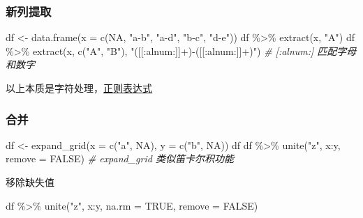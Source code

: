 \documentclass[
]{book}
\newenvironment{Shaded}{\begin{snugshade}}{\end{snugshade}}
\newcommand{\AttributeTok}[1]{\textcolor[rgb]{0.77,0.63,0.00}{#1}}
\newcommand{\CommentTok}[1]{\textcolor[rgb]{0.56,0.35,0.01}{\textit{#1}}}
\newcommand{\ConstantTok}[1]{\textcolor[rgb]{0.00,0.00,0.00}{#1}}
\newcommand{\FunctionTok}[1]{\textcolor[rgb]{0.00,0.00,0.00}{#1}}
\newcommand{\NormalTok}[1]{#1}
\newcommand{\OtherTok}[1]{\textcolor[rgb]{0.56,0.35,0.01}{#1}}
\newcommand{\SpecialCharTok}[1]{\textcolor[rgb]{0.00,0.00,0.00}{#1}}
\newcommand{\StringTok}[1]{\textcolor[rgb]{0.31,0.60,0.02}{#1}}
\begin{document}
\hypertarget{ux65b0ux5217ux63d0ux53d6}{%
\subsubsection{新列提取}\label{ux65b0ux5217ux63d0ux53d6}}

\begin{Shaded}
\begin{Highlighting}[]
\NormalTok{df }\OtherTok{\textless{}{-}} \FunctionTok{data.frame}\NormalTok{(}\AttributeTok{x =} \FunctionTok{c}\NormalTok{(}\ConstantTok{NA}\NormalTok{, }\StringTok{"a{-}b"}\NormalTok{, }\StringTok{"a{-}d"}\NormalTok{, }\StringTok{"b{-}c"}\NormalTok{, }\StringTok{"d{-}e"}\NormalTok{))}
\NormalTok{df }\SpecialCharTok{\%\textgreater{}\%} \FunctionTok{extract}\NormalTok{(x, }\StringTok{"A"}\NormalTok{)}
\NormalTok{df }\SpecialCharTok{\%\textgreater{}\%} \FunctionTok{extract}\NormalTok{(x, }\FunctionTok{c}\NormalTok{(}\StringTok{"A"}\NormalTok{, }\StringTok{"B"}\NormalTok{), }\StringTok{"([[:alnum:]]+){-}([[:alnum:]]+)"}\NormalTok{)}
\CommentTok{\# [:alnum:] 匹配字母和数字}
\end{Highlighting}
\end{Shaded}

以上本质是字符处理，\href{http://baiy.cn/utils/_regex_doc/index.htm}{正则表达式}

\hypertarget{ux5408ux5e76}{%
\subsubsection{合并}\label{ux5408ux5e76}}

\begin{Shaded}
\begin{Highlighting}[]
\NormalTok{df }\OtherTok{\textless{}{-}} \FunctionTok{expand\_grid}\NormalTok{(}\AttributeTok{x =} \FunctionTok{c}\NormalTok{(}\StringTok{"a"}\NormalTok{, }\ConstantTok{NA}\NormalTok{), }\AttributeTok{y =} \FunctionTok{c}\NormalTok{(}\StringTok{"b"}\NormalTok{, }\ConstantTok{NA}\NormalTok{))}
\NormalTok{df}
\NormalTok{df }\SpecialCharTok{\%\textgreater{}\%} \FunctionTok{unite}\NormalTok{(}\StringTok{"z"}\NormalTok{, x}\SpecialCharTok{:}\NormalTok{y, }\AttributeTok{remove =} \ConstantTok{FALSE}\NormalTok{)}
\CommentTok{\# expand\_grid 类似笛卡尔积功能}
\end{Highlighting}
\end{Shaded}

移除缺失值

\begin{Shaded}
\begin{Highlighting}[]
\NormalTok{df }\SpecialCharTok{\%\textgreater{}\%} \FunctionTok{unite}\NormalTok{(}\StringTok{"z"}\NormalTok{, x}\SpecialCharTok{:}\NormalTok{y, }\AttributeTok{na.rm =} \ConstantTok{TRUE}\NormalTok{, }\AttributeTok{remove =} \ConstantTok{FALSE}\NormalTok{)}
\end{Highlighting}
\end{Shaded}
\end{document}
